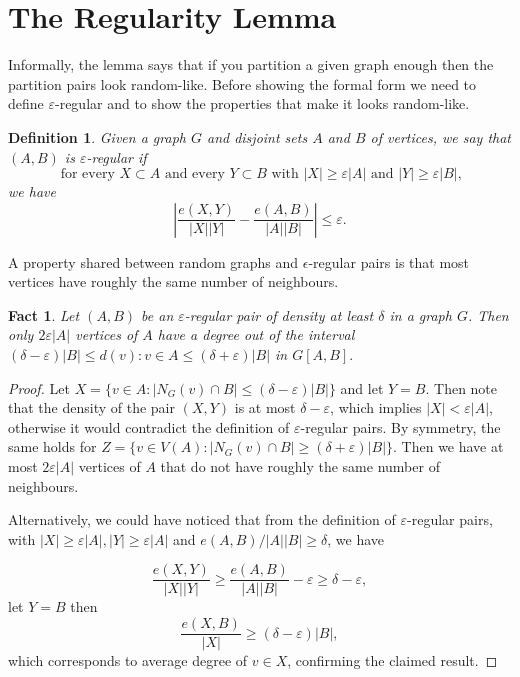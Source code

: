 \documentclass[12pt,twoside,a4paper]{book}
\numberwithin{equation}{section}
\newtheorem{definition}	[theorem] {Definition}
\newtheorem{fact}	[theorem] {Fact}
\theoremstyle{remark}
\begin{document}
\section{The Regularity Lemma}

Informally, the lemma says that if you partition a given graph enough then the partition pairs look random-like. Before showing the formal form we need to define $\varepsilon$-regular and to show the properties that make it looks random-like.

\begin{definition}
Given a graph $G$ and disjoint sets $A$ and $B$ of vertices, we say that $(A,B)$ is $\varepsilon$-regular if
$$\text{ for every } X \subset A \text{ and every } Y \subset B\text{ with } |X| \geq \varepsilon|A| \text{ and } |Y| \geq \varepsilon |B|,$$
we have
$$ \left| \frac{e(X,Y)}{|X||Y|} - \frac{e(A,B)}{|A||B|} \right| \leq \varepsilon  .$$
\end{definition}


A property shared between random graphs and $\epsilon$-regular pairs is that most vertices have roughly the same number of neighbours.

\begin{fact}\label{fact:503}
Let $(A,B)$ be an $\varepsilon$-regular pair of density at least $\delta$ in a graph $G$. Then only $2 \varepsilon |A| $ vertices of $A$ have a degree out of the interval $(\delta - \varepsilon)|B| \leq d(v): v \in A \leq (\delta + \varepsilon)|B|$ in $G[A,B].$
\end{fact}
\begin{proof}
Let $X = \{v \in A \colon | N_G(v) \cap B | \leq (\delta-\varepsilon)|B|\}$ and let $Y=B$. Then note that the density of the pair $(X,Y)$ is at most  $\delta - \varepsilon$, which implies $|X| < \varepsilon |A|$, otherwise it would contradict the definition of $\varepsilon$-regular pairs. By symmetry, the same holds for $Z = \{ v \in V(A) \colon |N_G(v) \cap B| \geq (\delta+\varepsilon)|B|\}$. Then we have at most $2 \varepsilon |A| $ vertices of $A$ that do not have roughly the same number of neighbours.

Alternatively, we could have noticed that from the definition of $\varepsilon$-regular pairs, with $|X| \geq \varepsilon|A|, |Y|\geq \varepsilon|A|$ and $e(A,B)/|A||B| \geq \delta $, we have

$$ \frac{e(X,Y)}{|X||Y|} \geq \frac{e(A,B)}{|A||B|} - \varepsilon \geq \delta - \varepsilon,$$
let $Y = B$ then
$$ \frac{e(X,B)}{|X|} \geq (\delta - \varepsilon)|B|,$$
which corresponds to average degree of $v \in X$, confirming the claimed result.
\end{proof}
\end{document}
